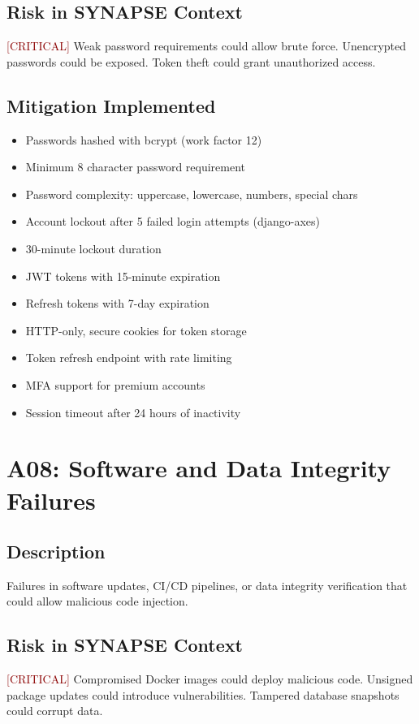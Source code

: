 \documentclass{report}
\begin{document}
\subsection{Risk in SYNAPSE Context}
\textcolor{darkred}{[CRITICAL]} Weak password requirements could allow brute force. Unencrypted passwords could be exposed. Token theft could grant unauthorized access.

\subsection{Mitigation Implemented}
\begin{itemize}
\item Passwords hashed with bcrypt (work factor 12)
\item Minimum 8 character password requirement
\item Password complexity: uppercase, lowercase, numbers, special chars
\item Account lockout after 5 failed login attempts (django-axes)
\item 30-minute lockout duration
\item JWT tokens with 15-minute expiration
\item Refresh tokens with 7-day expiration
\item HTTP-only, secure cookies for token storage
\item Token refresh endpoint with rate limiting
\item MFA support for premium accounts
\item Session timeout after 24 hours of inactivity
\end{itemize}

\section{A08: Software and Data Integrity Failures}

\subsection{Description}
Failures in software updates, CI/CD pipelines, or data integrity verification that could allow malicious code injection.

\subsection{Risk in SYNAPSE Context}
\textcolor{darkred}{[CRITICAL]} Compromised Docker images could deploy malicious code. Unsigned package updates could introduce vulnerabilities. Tampered database snapshots could corrupt data.
\end{document}
